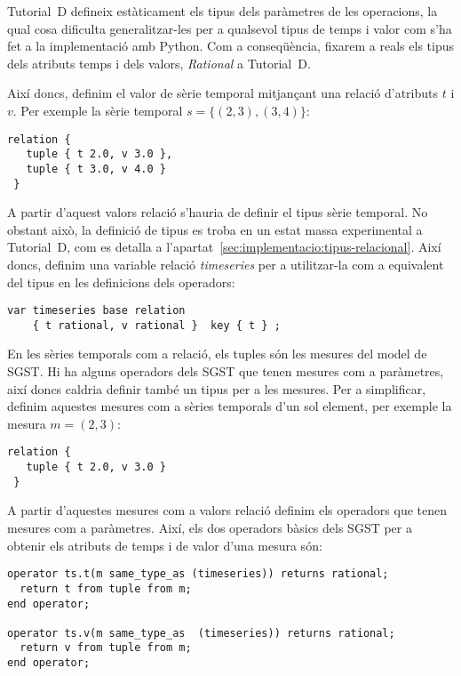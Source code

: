 Tutorial~D defineix estàticament els tipus dels paràmetres de les
operacions, la qual cosa dificulta generalitzar-les per a qualsevol
tipus de temps i valor com s'ha fet a la implementació amb Python. Com
a conseqüència, fixarem a reals els tipus dels atributs temps i dels
valors, \emph{Rational} a Tutorial~D.


Així doncs, definim el valor de sèrie temporal mitjançant
una relació d'atributs $t$ i $v$. Per exemple la sèrie temporal $s=\{
(2,3), (3,4) \}$:
\begin{lstlisting}[style=tutorialD]
relation {
   tuple { t 2.0, v 3.0 },
   tuple { t 3.0, v 4.0 }
 }
\end{lstlisting}


A partir d'aquest valors relació s'hauria de definir el tipus sèrie
temporal. No obstant això, la definició de tipus es troba en un estat
massa experimental a Tutorial~D, com es detalla a
l'apartat~\ref{sec:implementacio:tipus-relacional}. Així doncs,
definim una variable relació \emph{timeseries} per a utilitzar-la com a
equivalent del tipus en les definicions dels operadors:
\begin{lstlisting}[style=tutorialD]
var timeseries base relation
    { t rational, v rational }  key { t } ;
\end{lstlisting}


En les sèries temporals com a relació, els tuples són les mesures del
model de \gls{SGST}. Hi ha alguns operadors dels \gls{SGST} que tenen
mesures com a paràmetres, 
així doncs caldria definir també un tipus per a les mesures. Per a
simplificar, definim aquestes mesures com a sèries temporals d'un sol
element, per exemple la mesura $m=(2,3)$:
\begin{lstlisting}[style=tutorialD]
relation {
   tuple { t 2.0, v 3.0 }
 }
\end{lstlisting}


A partir d'aquestes mesures com a valors relació definim els operadors
que tenen mesures com a paràmetres. Així, els dos operadors bàsics
dels \gls{SGST} per a obtenir els atributs de temps i de valor d'una mesura
són:
\begin{lstlisting}[style=tutorialD]
operator ts.t(m same_type_as (timeseries)) returns rational;
  return t from tuple from m;
end operator;

operator ts.v(m same_type_as  (timeseries)) returns rational;
  return v from tuple from m;
end operator;
\end{lstlisting}


